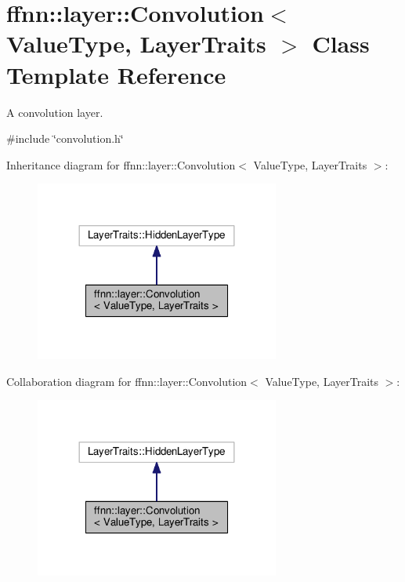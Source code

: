 \hypertarget{classffnn_1_1layer_1_1_convolution}{\section{ffnn\-:\-:layer\-:\-:Convolution$<$ Value\-Type, Layer\-Traits $>$ Class Template Reference}
\label{classffnn_1_1layer_1_1_convolution}
}


A convolution layer.  




{\ttfamily \#include \char`\"{}convolution.\-h\char`\"{}}



Inheritance diagram for ffnn\-:\-:layer\-:\-:Convolution$<$ Value\-Type, Layer\-Traits $>$\-:\nopagebreak
\begin{figure}[H]
\begin{center}
\leavevmode
\includegraphics[width=228pt]{classffnn_1_1layer_1_1_convolution__inherit__graph}
\end{center}
\end{figure}


Collaboration diagram for ffnn\-:\-:layer\-:\-:Convolution$<$ Value\-Type, Layer\-Traits $>$\-:\nopagebreak
\begin{figure}[H]
\begin{center}
\leavevmode
\includegraphics[width=228pt]{classffnn_1_1layer_1_1_convolution__coll__graph}
\end{center}
\end{figure}
